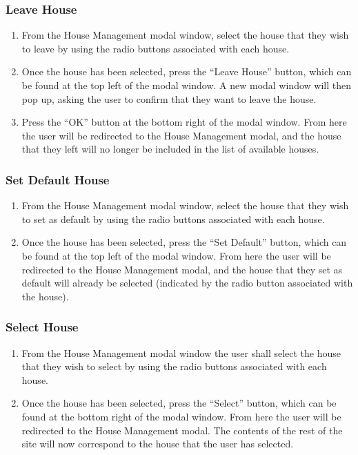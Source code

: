 \documentclass[12pt]{article}
\begin{document}
    \subsubsection{Leave House}
    \begin{enumerate}
        \item From the House Management modal window, select the house that they wish to leave by using the radio buttons associated with each house.
        \item Once the house has been selected, press the ``Leave House'' button, which can be found at the top left of the modal window. A new modal window will then pop up, asking the user to confirm that they want to leave the house.
        \item Press the ``OK'' button at the bottom right of the modal window. From here the user will be redirected to the House Management modal, and the house that they left will no longer be included in the list of available houses.
    \end{enumerate}

    \subsubsection{Set Default House}
    \begin{enumerate}
        \item From the House Management modal window, select the house that they wish to set as default by using the radio buttons associated with each house.
        \item Once the house has been selected, press the ``Set Default'' button, which can be found at the top left of the modal window. From here the user will be redirected to the House Management modal, and the house that they set as default will already be selected (indicated by the radio button associated with the house).
    \end{enumerate}

    \subsubsection{Select House}
    \begin{enumerate}
        \item From the House Management modal window the user shall select the house that they wish to select by using the radio buttons associated with each house.
        \item Once the house has been selected, press the ``Select'' button, which can be found at the bottom right of the modal window. From here the user will be redirected to the House Management modal. The contents of the rest of the site will now correspond to the house that the user has selected.
    \end{enumerate}
\end{document}
